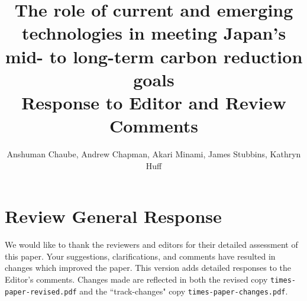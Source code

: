 \documentclass[answers,11pt]{exam}
\begin{document}


%

\title{The role of current and emerging technologies in meeting Japan's mid- to long-term carbon reduction goals\\
\large Response to Editor and Review Comments}
\author{Anshuman Chaube, Andrew Chapman, Akari Minami, James Stubbins, Kathryn Huff}



%
\maketitle
\section*{Review General Response}
We would like to thank the reviewers and editors for their detailed assessment of
this paper. Your suggestions, clarifications, and comments have resulted in 
changes which improved the paper. This version adds detailed responses to the Editor's comments. Changes made are reflected in both the revised copy \texttt{times-paper-revised.pdf} and the ``track-changes" copy \texttt{times-paper-changes.pdf}.
\end{document}
